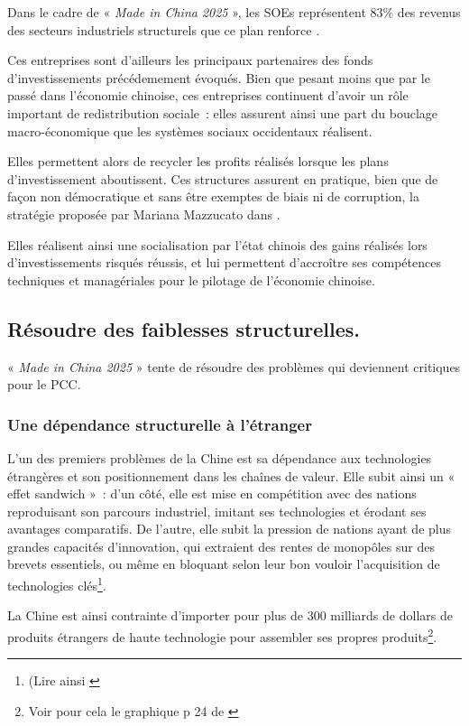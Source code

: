 \documentclass[a4paper]{article}
\begin{document}
Dans le cadre de « \textit{Made in China 2025} », les SOEs représentent 83\% des revenus des secteurs industriels structurels que ce plan renforce \cite{Evolving_MiC25}.

Ces entreprises sont d’ailleurs les principaux partenaires des fonds d’in\-vestis\-sements précédemement évoqués. Bien que pesant moins que par le passé dans l’économie chinoise, ces entreprises continuent d’avoir un rôle important de redistribution sociale~: elles assurent ainsi une part du bouclage macro-économique que les systèmes sociaux occidentaux réalisent.

Elles permettent alors de recycler les profits réalisés lorsque les plans d’in\-vestis\-sement aboutissent. Ces structures assurent en pratique, bien que de façon non démocratique et sans être exemptes de biais ni de corruption, la stratégie proposée par Mariana Mazzucato dans \cite{mazzucato18}.

Elles réalisent ainsi une socialisation par l’état chinois des gains réalisés lors d’investissements risqués réussis, et lui permettent d’accroître ses compétences techniques et managériales pour le pilotage de l’économie chinoise.

\subsection{Résoudre des faiblesses structurelles.}
\label{sec:orgebd142e}
« \textit{Made in China 2025} » tente de résoudre des problèmes qui deviennent critiques pour le PCC.

\subsubsection{Une dépendance structurelle à l’étranger}
\label{sec:orgd34c67b}
L’un des premiers problèmes de la Chine est sa dépendance aux technologies étrangères et son positionnement dans les chaînes de valeur. Elle subit ainsi un « effet sandwich »~: d’un côté, elle est mise en compétition avec des nations reproduisant son parcours industriel, imitant ses technologies et érodant ses avantages comparatifs. De l’autre, elle subit la pression de nations ayant de plus grandes capacités d’innovation, qui extraient des rentes de monopôles sur des brevets essentiels, ou même en bloquant selon leur bon vouloir l’acquisition de technologies clés\footnote{(Lire ainsi \cite{dollar20_china}}.

La Chine est ainsi contrainte d’importer pour plus de 300 milliards de dollars de produits étrangers de haute technologie pour assembler ses propres produits\footnote{Voir pour cela le graphique p 24 de \cite{Evolving_MiC25}}.
\end{document}
